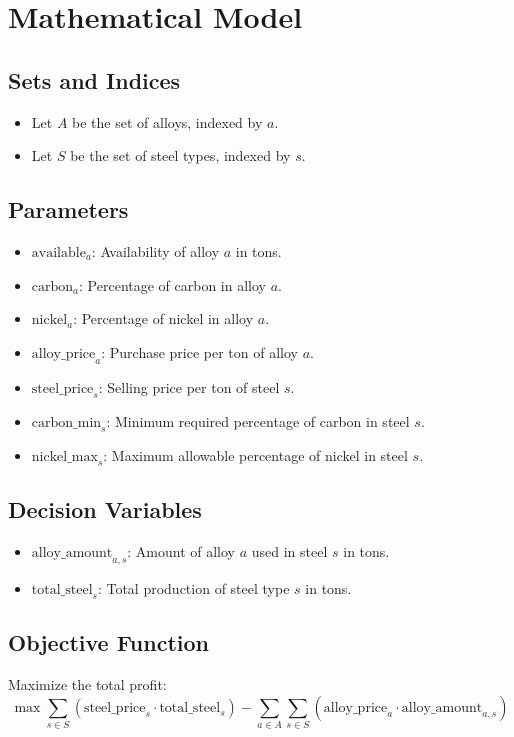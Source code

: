 \documentclass{article}
\begin{document}
\section*{Mathematical Model}

\subsection*{Sets and Indices}
\begin{itemize}
    \item Let \( A \) be the set of alloys, indexed by \( a \).
    \item Let \( S \) be the set of steel types, indexed by \( s \).
\end{itemize}

\subsection*{Parameters}
\begin{itemize}
    \item \( \text{available}_a \): Availability of alloy \( a \) in tons.
    \item \( \text{carbon}_a \): Percentage of carbon in alloy \( a \).
    \item \( \text{nickel}_a \): Percentage of nickel in alloy \( a \).
    \item \( \text{alloy\_price}_a \): Purchase price per ton of alloy \( a \).
    \item \( \text{steel\_price}_s \): Selling price per ton of steel \( s \).
    \item \( \text{carbon\_min}_s \): Minimum required percentage of carbon in steel \( s \).
    \item \( \text{nickel\_max}_s \): Maximum allowable percentage of nickel in steel \( s \).
\end{itemize}

\subsection*{Decision Variables}
\begin{itemize}
    \item \( \text{alloy\_amount}_{a,s} \): Amount of alloy \( a \) used in steel \( s \) in tons.
    \item \( \text{total\_steel}_s \): Total production of steel type \( s \) in tons.
\end{itemize}

\subsection*{Objective Function}
Maximize the total profit:
\[
\max \sum_{s \in S} \left( \text{steel\_price}_s \cdot \text{total\_steel}_s \right) - \sum_{a \in A} \sum_{s \in S} \left( \text{alloy\_price}_a \cdot \text{alloy\_amount}_{a,s} \right)
\]
\end{document}
